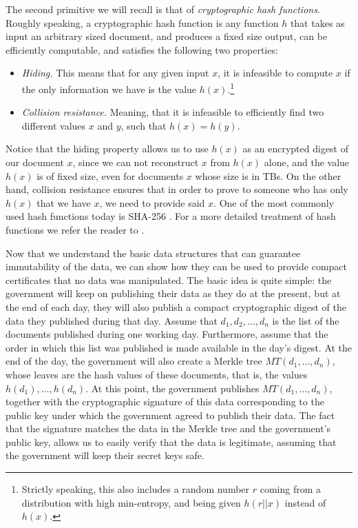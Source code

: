 The second primitive we will recall is that of {\em cryptographic hash functions}. Roughly speaking, a cryptographic hash function is any function $h$ that takes as input an arbitrary sized document, and produces a fixed size output, can be efficiently computable, and satisfies the following two properties:
\begin{itemize}
\item {\em Hiding.} This means that for any given input $x$, it is infeasible to compute $x$ if the only information we have is the value $h(x)$.\footnote{Strictly speaking, this also includes a random number $r$ coming from a distribution with high min-entropy, and being given $h(r||x)$ instead of $h(x)$.}
\item {\em Collision resistance.} Meaning, that it is infeasible to efficiently find two different values $x$ and $y$, such that $h(x)=h(y)$.
\end{itemize}
Notice that the hiding property allows us to use $h(x)$ as an encrypted digest of our document $x$, since we can not reconstruct $x$ from $h(x)$ alone, and the value $h(x)$ is of fixed size, even for documents $x$ whose size is in TBs. On the other hand, collision resistance ensures that in order to prove to someone who has only $h(x)$ that we have $x$, we need to provide said $x$. One of the most commonly used hash functions today is SHA-256 \cite{sha_standard}. For a more detailed treatment of hash functions we refer the reader to \cite{bitcoinbook}.

\medskip
{}


\medskip
{} Now that we understand the basic data structures that can guarantee immutability of the data, we can show how they can be used to provide compact certificates that no data was manipulated. The basic idea is quite simple: the government will keep on publishing their data as they do at the present, but at the end of each day, they will also publish a compact cryptographic digest of the data they published during that day. Assume that $d_1,d_2,\ldots ,d_n$ is the list of the documents published during one working day. Furthermore, assume that the order in which this list was published is made available in the day's digest. At the end of the day, the government will also create a Merkle tree $MT(d_1,\ldots ,d_n)$, whose leaves are the hash values of these documents, that is, the values $h(d_1),\ldots ,h(d_n)$. At this point, the government publishes $MT(d_1,\ldots ,d_n)$, together with the cryptographic signature of this data corresponding to the public key under which the government agreed to publish their data. The fact that the signature matches the data in the Merkle tree and the government's public key, allows us to easily verify that the data is legitimate, assuming that the government will keep their secret keys safe.

